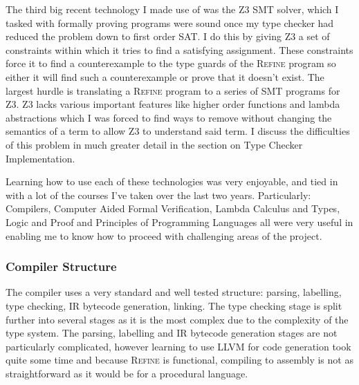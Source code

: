The third big recent technology I made use of was the Z3 SMT solver, which I tasked with formally
proving programs were sound once my type checker had reduced the problem down to first order SAT.
I do this by giving Z3 a set of constraints within which it tries to find a satisfying assignment.
These constraints force it to find a counterexample to the type guards of the \textsc{Refine} program so
either it will find such a counterexample or prove that it doesn't exist.
The largest hurdle is translating a \textsc{Refine} program to a series of SMT programs for Z3.
Z3 lacks various important features like higher order functions and lambda abstractions which I
was forced to find ways to remove without changing the semantics of a term to allow Z3 to understand
said term.
I discuss the difficulties of this problem in much greater detail in the section on
Type Checker Implementation.

\bigskip

Learning how to use each of these technologies was very enjoyable, and tied in with a lot of the
courses I've taken over the last two years.
Particularly: Compilers, Computer Aided Formal Verification, Lambda Calculus and Types, Logic and Proof
and Principles of Programming Languages all were very useful in enabling me to know how to proceed
with challenging areas of the project.

\subsubsection{Compiler Structure}

The compiler uses a very standard and well tested structure: parsing, labelling, type checking,
IR bytecode generation, linking.
The type checking stage is split further into several stages as it is the most complex due to the
complexity of the type system.
The parsing, labelling and IR bytecode generation stages are not particularly complicated, however
learning to use LLVM for code generation took quite some time and because \textsc{Refine} is functional,
compiling to assembly is not as straightforward as it would be for a procedural language.
